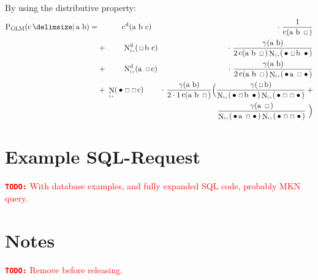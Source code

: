 \documentclass[m,bachelor,binding]{WeSTthesis}
\newcommand*{\Scale}[2][4]{\scalebox{#1}{$#2$}}%
\DeclareMathOperator{\Count}{c}
\DeclareMathOperator{\ContCount}{N}
\newcommand{\ContCountIp}  {\ContCount_{\Scale[0.5]{1+}}}
\newcommand{\Skp}{\ensuremath{\,\Scale[0.7]{\square}\,}}
\newcommand{\WSkp}{\ensuremath{\,\bullet\,}}
\newcommand{\todo}[1]{\textcolor{red}{{\footnotesize\textbf{\texttt{TODO:}}} #1}}
\begin{document}
{\begin{appendices}
By using the distributive property:
\begin{eqnarray}
  \ProbGLM {\text{c}}{\text{a b}} =
    &\phantom{+} \; \hspace{2.0em} \DiscountedCount (\text{a b c})    & \hspace{-0.5em} \cdot\  \frac{1}{\Count(\text{a b \Skp})} \\
    &         +  \; \hspace{2.0em} \DiscountedCount*(\text{\Skp b c}) & \hspace{-0.5em} \cdot\  \frac{\gamma(\text{a b})}{2 \Count(\text{a b \Skp}) \ContCountIp(\text{\WSkp \Skp b \WSkp})} \nonumber \\
    &         +  \; \hspace{2.0em} \DiscountedCount*(\text{a \Skp c}) & \hspace{-0.5em} \cdot\  \frac{\gamma(\text{a b})}{2 \Count(\text{a b \Skp}) \ContCountIp(\text{\WSkp a \Skp \WSkp})} \nonumber \\
    &         +  \; \ContCountIp(\text{\WSkp\Skp \Skp c})      & \hspace{-0.5em} \cdot\  \frac{\gamma(\text{a b})}{2 \cdot 1 \Count(\text{a b \Skp})} \Big(\frac{\gamma(\text{\Skp b})}{\ContCountIp(\text{\WSkp \Skp b \WSkp}) \ContCountIp(\text{\WSkp \Skp \Skp \WSkp})} \: + \nonumber \\
    &                                                          & \hspace{6.8em}                                                                            \frac{\gamma(\text{a \Skp})}{\ContCountIp(\text{\WSkp a \Skp \WSkp}) \ContCountIp(\text{\WSkp \Skp \Skp \WSkp})} \ \Big) \nonumber
\end{eqnarray}

\chapter{Example SQL-Request}
\label{app:sql-example}

\todo{With database examples, and fully expanded SQL code, probably MKN query.}

\chapter{Notes}

\todo{Remove before releasing.}


\end{appendices}}
\end{document}
